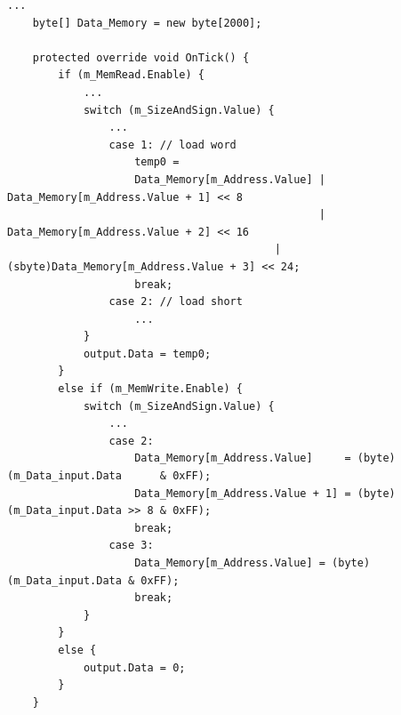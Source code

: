         \begin{minipage}{\linewidth}
            \begin{lstlisting}[language={[Sharp]C}, caption={A slice of the \texttt{Data Memory} process SME code. Similar to the instruction memory, the data memory consists of a byte array, which we made 2000 elements long in this case. As there can only be read or written to the data memory once per clock cycle, we simply construct an \texttt{if/else} statement, which uses control signals to determine the procedure to be done. Both the read and write procedures needs to know the size and sign of the data to be loaded or written. Therefore a \texttt{switch} statement has been added to both outcomes, which uses \texttt{SizeAndSign} control signal to choose between the cases. When reading the data from memory we need to remember that it is little-endian addressed  so before we output the value the bits need to be shuffled around in the correct order, so the correct value is added to the register, as that is big-endian. When writing the data the opposite need to happen, so a big-endian value need to be converted to a little-endian one. If both read and write control signals are deasserted I choose to output 0.},captionpos=b, label = DM]
...
    byte[] Data_Memory = new byte[2000];
            
    protected override void OnTick() {
        if (m_MemRead.Enable) {
            ...
            switch (m_SizeAndSign.Value) {
                ...
                case 1: // load word
                    temp0 =
                    Data_Memory[m_Address.Value] | Data_Memory[m_Address.Value + 1] << 8
                                                 | Data_Memory[m_Address.Value + 2] << 16
                                          | (sbyte)Data_Memory[m_Address.Value + 3] << 24;
                    break;
                case 2: // load short
                    ...
            }
            output.Data = temp0;
        }
        else if (m_MemWrite.Enable) {
            switch (m_SizeAndSign.Value) {
                ...
                case 2:
                    Data_Memory[m_Address.Value]     = (byte)(m_Data_input.Data      & 0xFF);
                    Data_Memory[m_Address.Value + 1] = (byte)(m_Data_input.Data >> 8 & 0xFF);
                    break;
                case 3:
                    Data_Memory[m_Address.Value] = (byte)(m_Data_input.Data & 0xFF); 
                    break;
            }
        }
        else {
            output.Data = 0;
        }
    }
            \end{lstlisting}
        \end{minipage} 
    

